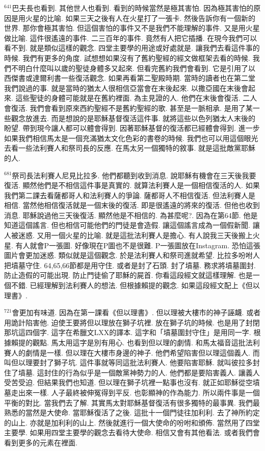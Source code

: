 \documentclass{book}
\begin{document}
$^{641}$巴夫長也看到.
其他世人也看到.
看到的時候當然是極其害怕.
因為極其害怕的原因是用火星的比喻.
如果三天之後有人在火星打了一張卡.
然後告訴你有一個新的世界.
那你會極其害怕.
但這個害怕的事件又不是我們不能理解的事件.
又是用火星做比喻.
這件很遙遠的事件.
二三百年的事件.
竟然有人把它插播.
在現今我們可以看不到.
就是類似這樣的觀念.
四堂主要學的用途或好處就是.
讓我們去看這件事的時候.
我們有更多的角度.
試想想如果沒有了舊約聖經的經文做框架去看的時候.
我們不明白什麼叫以歲的聖徒身體多又起來.
但看完舊約我們會看到.
它是引用了以西傑書或達爾利書一些復活觀念.
如果再看第二聖殿時期.
當時的讀者也在第二堂我們說過的事.
就是當時的猶太人很相信亞當會在末後起來.
以撒亞國在末後會起來.
這些聖徒的身體可能就是在舊約裡面.
為主見證的人.
他們在末後會復活.
二人會復活.
我們會看到原來西約聖經不是舊約聖經的歌.
甚至是一脈相承.
是用了某一些觀念放進去.
而是想說的是耶穌基督復活這件事.
就將這些以色列猶太人末後的盼望.
帶到現今讓人都可以體會得到.
因著耶穌基督的復活都已經體會得到.
進一步如果我們相信馬太是一個充滿猶太文化色彩的書卷的時候.
我們也可以用這個眼光去看一些法利賽人和祭司長的反應.
在馬太另一個獨特的敘事.
就是這批敵黨耶穌的人.

$^{681}$祭司長法利賽人尼見比拉多.
他們都聽到收到消息.
說耶穌有機會在三天後我要復活.
顯然他們是不相信這件事是真實的.
就算法利賽人是一個相信復活的人.
如果我們第二課去看薩都哥人和法利賽人的爭論.
薩都哥人不相信復活.
但法利賽人是相信.
當然他相信復活就是一個末後的復活.
即是很遙遠的將來的復活.
但他也收到消息.
耶穌說過他三天後復活.
顯然他是不相信的.
為甚麼呢?.
因為在第64節.
他是知道這個謠言.
但也相信可能他們的門徒是會造假.
讓這個謠言成為一個假新聞.
讓人被迷惑.
又用一個火星的比喻.
就是這批法利賽人是擔心.
有人說我三天後搬上火星.
有人就會P一張圖.
好像現在P圖也不是很難.
P一張圖放在Instagram.
恐怕這張圖片會更加迷惑.
類似就是這個觀念.
於是法利賽人和祭司進就希望.
比拉多吩咐人把墳墓守住.
64,65,66節都是用守住.
或者是封了石頭.
封了墳墓.
務求將墳墓圍封.
防止造假的可能出現.
防止門徒偷了耶穌的屍首.
你看這段經文就這樣理解.
也是一個不錯.
已經理解到法利賽人的想法.
但根據賴提的觀念.
如果這段經文配上《但以理書》.

$^{721}$會更加有味道.
因為在第一課看《但以理書》.
但以理被大樓市的神子誣衊.
或者用詭計陷害他.
迫使王要將但以理放在獅子坑裡.
放在獅子坑的時候.
也是用了封閉那坑這四個字.
這字在希臘文LXX的譯本.
這字和「墳墓圍封守住」是用同一字.
根據賴提的觀點.
馬太用這字是別有用心.
也看到但以理的劇情.
和馬太福音這批法利賽人的劇情是一樣.
但以理在大樓市身邊的神子.
他們希望陷害但以理這個義人.
而叫但以理要封了獅子坑.
這件事就等同這批法利賽人.
他要陷害耶穌.
就叫彼拉多封住了墳墓.
這封住的行為似乎是一個敵黨神勢力的人.
他們都是要陷害義人.
讓義人受苦受迫.
但結果我們也知道.
但以理在獅子坑裡一點事也沒有.
就正如耶穌從空墳墓走出來一樣.
人子最終被伸冤得到平反.
也彰顯神的作為能力.
所以兩件事是一個平衡的對比.
當我們去了解.
其實馬太對耶穌基督復活有很多獨特的最事異.
我們最熟悉的當然是大使命.
當耶穌復活了之後.
這批十一個門徒往加利利.
去了神所約定的山上.
亦就是加利利的山上.
然後就進行一個大使命的吩咐和頒佈.
當然用了四堂主要學.
如果用四堂主要學的觀念去看待大使命.
相信又會有其他看法.
或者我們會看到更多的元素在裡面.
\end{document}
